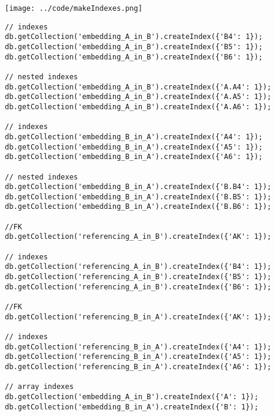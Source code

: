 \begin{center}
  \texttt{[image: ../code/makeIndexes.png]}
\end{center}

\begin{lstlisting}[caption=making indexes, style=customJs]
// indexes
db.getCollection('embedding_A_in_B').createIndex({'B4': 1});
db.getCollection('embedding_A_in_B').createIndex({'B5': 1});
db.getCollection('embedding_A_in_B').createIndex({'B6': 1});

// nested indexes
db.getCollection('embedding_A_in_B').createIndex({'A.A4': 1});
db.getCollection('embedding_A_in_B').createIndex({'A.A5': 1});
db.getCollection('embedding_A_in_B').createIndex({'A.A6': 1});

// indexes
db.getCollection('embedding_B_in_A').createIndex({'A4': 1});
db.getCollection('embedding_B_in_A').createIndex({'A5': 1});
db.getCollection('embedding_B_in_A').createIndex({'A6': 1});

// nested indexes
db.getCollection('embedding_B_in_A').createIndex({'B.B4': 1});
db.getCollection('embedding_B_in_A').createIndex({'B.B5': 1});
db.getCollection('embedding_B_in_A').createIndex({'B.B6': 1});

//FK
db.getCollection('referencing_A_in_B').createIndex({'AK': 1});               

// indexes
db.getCollection('referencing_A_in_B').createIndex({'B4': 1});
db.getCollection('referencing_A_in_B').createIndex({'B5': 1});
db.getCollection('referencing_A_in_B').createIndex({'B6': 1});

//FK
db.getCollection('referencing_B_in_A').createIndex({'AK': 1});               

// indexes
db.getCollection('referencing_B_in_A').createIndex({'A4': 1});
db.getCollection('referencing_B_in_A').createIndex({'A5': 1});
db.getCollection('referencing_B_in_A').createIndex({'A6': 1});

// array indexes
db.getCollection('embedding_A_in_B').createIndex({'A': 1});
db.getCollection('embedding_B_in_A').createIndex({'B': 1});
\end{lstlisting}

% 
